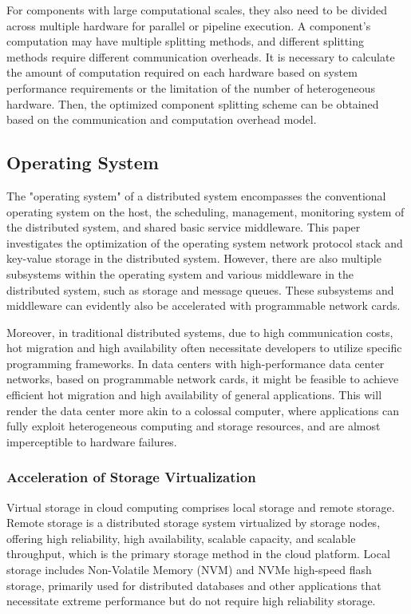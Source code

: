 For components with large computational scales, they also need to be divided across multiple hardware for parallel or pipeline execution. A component's computation may have multiple splitting methods, and different splitting methods require different communication overheads. It is necessary to calculate the amount of computation required on each hardware based on system performance requirements or the limitation of the number of heterogeneous hardware. Then, the optimized component splitting scheme can be obtained based on the communication and computation overhead model.

\subsection{Operating System}
\label{future:os}

The "operating system" of a distributed system encompasses the conventional operating system on the host, the scheduling, management, monitoring system of the distributed system, and shared basic service middleware. This paper investigates the optimization of the operating system network protocol stack and key-value storage in the distributed system. However, there are also multiple subsystems within the operating system and various middleware in the distributed system, such as storage and message queues. These subsystems and middleware can evidently also be accelerated with programmable network cards.

Moreover, in traditional distributed systems, due to high communication costs, hot migration and high availability often necessitate developers to utilize specific programming frameworks. In data centers with high-performance data center networks, based on programmable network cards, it might be feasible to achieve efficient hot migration and high availability of general applications. This will render the data center more akin to a colossal computer, where applications can fully exploit heterogeneous computing and storage resources, and are almost imperceptible to hardware failures.

\subsubsection{Acceleration of Storage Virtualization}
\label{future:storage-virtualization}

Virtual storage in cloud computing comprises local storage and remote storage. Remote storage is a distributed storage system virtualized by storage nodes, offering high reliability, high availability, scalable capacity, and scalable throughput, which is the primary storage method in the cloud platform. Local storage includes Non-Volatile Memory (NVM) and NVMe high-speed flash storage, primarily used for distributed databases and other applications that necessitate extreme performance but do not require high reliability storage.

